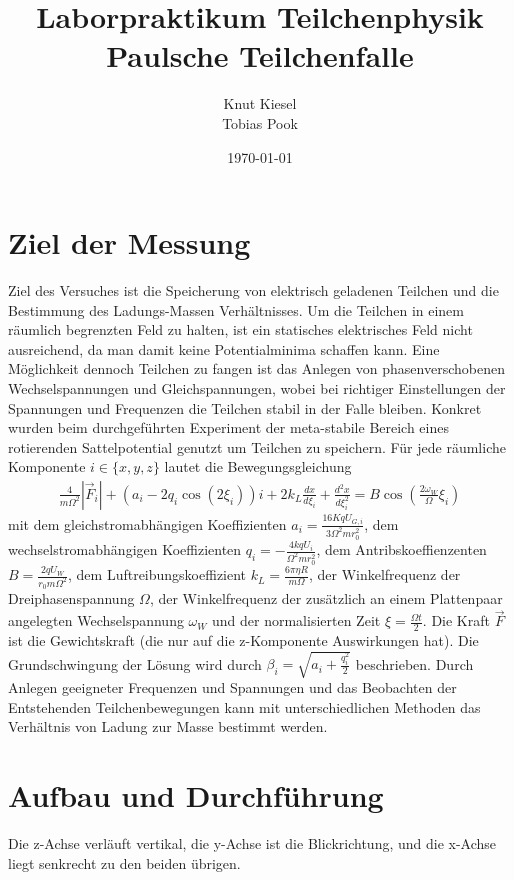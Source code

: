 \documentclass[a4paper,12pt]{article}
\title{Laborpraktikum Teilchenphysik\\ Paulsche Teilchenfalle}
\author{Knut Kiesel\\Tobias Pook}
\date{\today}
\begin{document}
\maketitle
\thispagestyle{empty}
\newpage
\tableofcontents
\setcounter{page}{1}
\newpage 

\section{Ziel der Messung} %
Ziel des Versuches ist die Speicherung von elektrisch geladenen Teilchen und die Bestimmung des Ladungs-Massen Verhältnisses.
Um die Teilchen in einem räumlich begrenzten Feld zu halten, ist ein statisches elektrisches Feld nicht ausreichend, da man damit keine Potentialminima schaffen kann.
Eine Möglichkeit dennoch Teilchen zu fangen ist das Anlegen von phasenverschobenen Wechselspannungen und Gleichspannungen, wobei bei richtiger Einstellungen der Spannungen und Frequenzen die Teilchen stabil in der Falle bleiben.
Konkret wurden beim durchgeführten Experiment der meta-stabile Bereich eines rotierenden Sattelpotential genutzt um Teilchen zu speichern.
Für jede räumliche Komponente $i\in\{x,y,z\}$ lautet die Bewegungsgleichung
\begin{align*}\label{mastergleichung}
	\frac{4}{mΩ^2} |\vec{F}_i| + \left( a_i -2q_i \cos\left( 2\xi_i \right) \right) i  + 2k_L \frac{dx}{d\xi_i} + \frac{d^2x}{d\xi_i^2} = B\cos\left( \frac{2ω_W}{Ω}ξ_i \right)
\end{align*}
mit dem gleichstromabhängigen Koeffizienten $a_i = \frac{16KqU_{G,i}}{3Ω^2mr_0^2}$,
dem wechselstromabhängigen Koeffizienten  $q_i = -\frac{4kqU_i}{Ω^2mr_0^2}$,
dem Antribskoeffienzenten $B = \frac{2qU_W}{r_0mΩ^2}$,
dem Luftreibungskoeffizient $k_L = \frac{6πηR}{mΩ}$, der Winkelfrequenz der Dreiphasenspannung $Ω$,
der Winkelfrequenz der zusätzlich an einem Plattenpaar angelegten Wechselspannung $ω_W$
und der normalisierten Zeit $ξ = \frac{Ωt}{2}$.
Die Kraft $\vec{F}$ ist die Gewichtskraft (die nur auf die z-Komponente Auswirkungen hat).
Die Grundschwingung der Lösung wird durch $β_i = \sqrt{a_i + \frac{q_i^2}{2}}$ beschrieben.
Durch Anlegen geeigneter Frequenzen und Spannungen und das Beobachten der Entstehenden Teilchenbewegungen kann mit unterschiedlichen Methoden das Verhältnis von Ladung zur Masse bestimmt werden.


\section{Aufbau und Durchführung}
Die z-Achse verläuft vertikal, die y-Achse ist die Blickrichtung, und die x-Achse liegt senkrecht zu den beiden übrigen.
\end{document}
